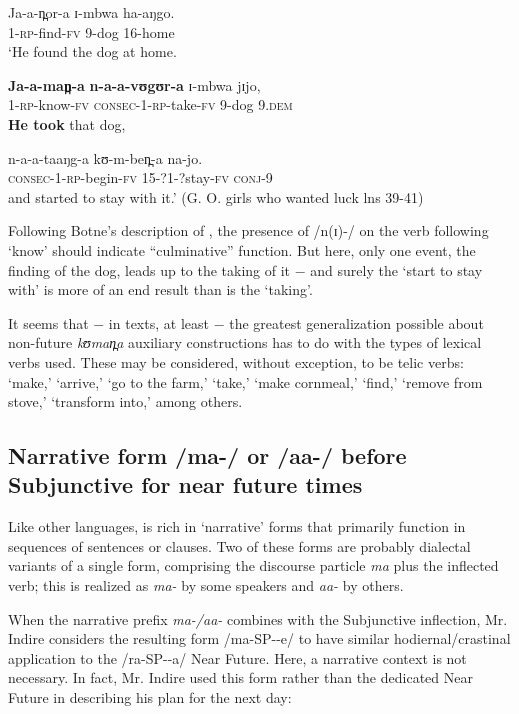 \documentclass[output=paper]{langsci/langscibook}
\begin{document}
\ea\label{ex:sarvasy:27}
\gll Ja-a-n̪or-a   ɪ-mbwa   ha-aŋgo. \\
1-\textsc{rp}-find-\textsc{fv}  9-dog    16-home \\
\glt ‘He found the dog at home.

\gll \textbf{Ja-a-man̪-a}   \textbf{n-a-a-vʊgʊr-a}     ɪ-mbwa   jɪjo, \\
1-\textsc{rp}-know-\textsc{fv}  \textsc{consec}-1-\textsc{rp}-take-\textsc{fv}  9-dog    9.\textsc{dem} \\
\glt \textbf{He took} that dog,

\gll n-a-a-taaŋg-a       kʊ-m-ben̪-a     na-jo. \\
\textsc{consec}-1-\textsc{rp}-begin-\textsc{fv}  15-?1-?stay-\textsc{fv}  \textsc{conj}-9 \\
\glt and started to stay with it.’ (G. O. girls who wanted luck lns 39-41)
\z 

Following Botne’s description of , the presence of /n(ɪ)-/ on the verb following ‘know’ should indicate “culminative” function. But here, only one event, the finding of the dog, leads up to the taking of it $-$ and surely the ‘start to stay with’ is more of an end result than is the ‘taking’.

It seems that $-$ in  texts, at least $-$ the greatest generalization possible about non-future \textit{kʊman̪a} auxiliary constructions has to do with the types of lexical verbs used. These may be considered, without exception, to be telic verbs: ‘make,’ ‘arrive,’ ‘go to the farm,’ ‘take,’ ‘make cornmeal,’ ‘find,’ ‘remove from stove,’ ‘transform into,’ among others.

\subsection{Narrative form /ma-/ or /aa-/ before Subjunctive for near future times} \label{sec:sarvasy:7.4}

Like other  languages,  is rich in ‘narrative’ %
%
forms that primarily function in sequences of sentences or clauses. Two of these forms are probably dialectal variants of a single form, comprising the discourse particle \textit{ma} plus the inflected verb; this is realized as \textit{ma-} by some speakers and \textit{aa-} by others.

When the narrative prefix \textit{ma-/aa-} combines with the Subjunctive inflection, {Mr. Indire} considers the resulting form /ma-SP-{\longrule}-e/ to have similar hodiernal/crastinal application to the /ra-SP-{\longrule}-a/ Near Future. Here, a narrative context is not necessary. In fact, {Mr. Indire} used this form rather than the dedicated Near Future in describing his plan for the next day:
\end{document}
